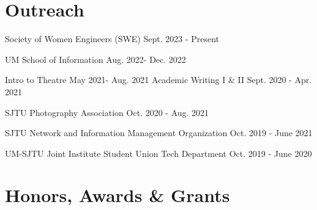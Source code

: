 

\section{\textbf{Outreach}}
\vspace{-0.4mm}
\resumeSubHeadingListStart
{} %
    {Society of Women Engineers (SWE)} %
    {Sept. 2023 - Present} %
        \vspace{-1.5mm}  
        
    {UM School of Information} %
    {Aug. 2022- Dec. 2022} %
        \vspace{-1.5mm}  



    {Intro to Theatre} %
    {May 2021- Aug. 2021} %
        \vspace{-1.5mm}  
    {Academic Writing I \& II} %
    {Sept. 2020 - Apr. 2021} %
       \vspace{-1.5mm}  
       
    {SJTU Photography Association} %
    {Oct. 2020 - Aug. 2021} %
       \vspace{-1.5mm}  
       
    {SJTU Network and Information Management Organization}%
    {Oct. 2019 - June 2021} %
       \vspace{-1.5mm}  



    {UM-SJTU Joint Institute Student Union Tech Department} %
    {Oct. 2019 - June 2020} %
      \vspace{-1.5mm}  
        
\resumeSubHeadingListEnd
\vspace{-5mm}


\section{\textbf{Honors, Awards \& Grants}}
\vspace{-0.4mm}
\resumeSubHeadingListStart 

